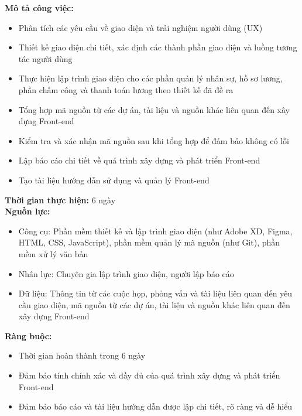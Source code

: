 {\begin{minipage}{\textwidth}
\begin{itemize}
    \end{itemize}
    \vspace{0.5cm}
    \noindent \textbf{Mô tả công việc:}
    \begin{itemize}
        \item Phân tích các yêu cầu về giao diện và trải nghiệm người dùng (UX)
        \item Thiết kế giao diện chi tiết, xác định các thành phần giao diện và luồng tương tác người dùng
        \item Thực hiện lập trình giao diện cho các phần quản lý nhân sự, hồ sơ lương, phần chấm công và thanh toán lương theo thiết kế đã đề ra
        \item Tổng hợp mã nguồn từ các dự án, tài liệu và nguồn khác liên quan đến xây dựng Front-end
        \item Kiểm tra và xác nhận mã nguồn sau khi tổng hợp để đảm bảo không có lỗi
        \item Lập báo cáo chi tiết về quá trình xây dựng và phát triển Front-end
        \item Tạo tài liệu hướng dẫn sử dụng và quản lý Front-end
    \end{itemize}
    \vspace{0.5cm}
    \noindent \textbf{Thời gian thực hiện:} 6 ngày \\
    \noindent \textbf{Nguồn lực:}
    \begin{itemize}
        \item Công cụ: Phần mềm thiết kế và lập trình giao diện (như Adobe XD, Figma, HTML, CSS, JavaScript), phần mềm quản lý mã nguồn (như Git), phần mềm xử lý văn bản
        \item Nhân lực: Chuyên gia lập trình giao diện, người lập báo cáo
        \item Dữ liệu: Thông tin từ các cuộc họp, phỏng vấn và tài liệu liên quan đến yêu cầu giao diện, mã nguồn từ các dự án, tài liệu và nguồn khác liên quan đến xây dựng Front-end
    \end{itemize}
    \vspace{0.5cm}
    \noindent \textbf{Ràng buộc:}
    \begin{itemize}
        \item Thời gian hoàn thành trong 6 ngày
        \item Đảm bảo tính chính xác và đầy đủ của quá trình xây dựng và phát triển Front-end
        \item Đảm bảo báo cáo và tài liệu hướng dẫn được lập chi tiết, rõ ràng và dễ hiểu
    \end{itemize}

\end{minipage}}
